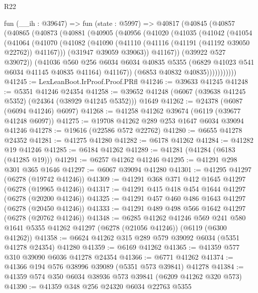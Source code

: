 \begin{lexlean}{R22}
\begin{coremodule}
    fun (__ih : @39647) =>
    fun (state : @5997) =>
    @40817
      (@40845
        (@40857
          (@40865
            (@40873
              (@40881
                (@40905
                  (@40956
                    (@41020
                      (@41035
                        (@41042
                          (@41054
                            (@41064
                              (@41070
                                (@41082
                                  (@41090 (@41110 (@41116 (@41191 (@41192 @39050 @22762)) @41167)))
                                  (@31947 @39059 @39063))
                                @41167))
                            (@39922 @527 @39072))
                          (@41036
                            @560
                            @256
                            @6034
                            @6034
                            @40835
                            @5355
                            (@6829 @41023 @541 @6034 @41145 @40835 @41164)
                            @41167))
                        (@6853 @40832 @40835)))))))))))
@41245 := LexLeanBoot.IrProof.Proof.PRfl
@41246 := @39633 @41245
@41248 := @5351 @41246 @24354
@41258 := @39652 @41248 (@6067 (@39638 @41245 @5352) (@24364 (@38929 @41245 @5352))) @1649
@41262 := @24378 (@6087 (@6094 @41246) @6097)
@41268 := @41258 @41262 @39674 (@6119 (@39677 @41248 @6097))
@41275 := @19708 @41262 @289 @253 @1647 @6034 @39094 @41246
@41278 := @19616 (@22586 @572 @22762)
@41280 := @6655 @41278 @24352
@41281 := @41275 @41280
@41282 := @6178 @41262
@41284 := @41282 @19 @41246
@41285 := @6184 @41262
@41289 := @41281 (@41284 (@6183 (@41285 @19)))
@41291 := @6257 @41262 @41246
@41295 := @41291 @298 @301 @365 @1646
@41297 := @6067 @39094 @41280
@41301 := @41295 @41297 (@6278 (@19742 @41246))
@41309 := @41291 @368 @371 @412 @1645 @41297 (@6278 (@19965 @41246))
@41317 := @41291 @415 @418 @454 @1644 @41297 (@6278 (@20200 @41246))
@41325 := @41291 @457 @460 @486 @1643 @41297 (@6278 (@20450 @41246))
@41333 := @41291 @489 @498 @566 @1642 @41297 (@6278 (@20762 @41246))
@41348 := @6285
    @41262
    @41246
    @569
    @241
    @580
    @1641
    @5355
    @41262
    @41297
    (@6278 (@21056 @41246))
    (@6119 (@6300 @41262))
@41358 := @6624 @41262 @315 @289 @579 @39092 @6034 (@5351 @41278 @24354) @41280
@41359 := @6169 @41262
@41365 := @41359 @577 @310 @39090 @6036 @41278 @24354
@41366 := @6771 @41262
@41374 := @41366 @194 @576 @38996 @39089 (@5351 @573 @39841) @41278
@41384 := @41359 @574 @350 @6034 @38936 @573 @39841 (@6209 @41262 @320 @573)
@41390 := @41359 @348 @256 @24320 @6034 @22763 @5355

\end{coremodule}
\end{lexlean}
